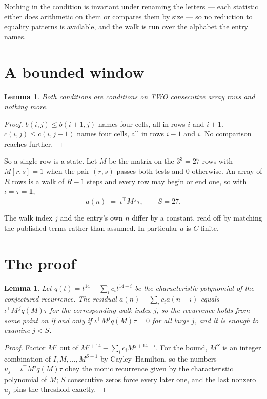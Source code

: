 \documentclass[11pt,a4paper]{article}
\theoremstyle{plain}
\newtheorem{lemma}[theorem]{Lemma}
\theoremstyle{definition}
\begin{document}
Nothing in the condition is invariant under renaming the letters --- each statistic either does
arithmetic on them or compares them by size --- so no reduction to equality patterns is
available, and the walk is run over the alphabet the entry names.

\section{A bounded window}

\begin{lemma}\label{lem:win}
Both conditions are conditions on TWO consecutive array rows and nothing more.
\end{lemma}

\begin{proof}
$b(i,j)\le b(i{+}1,j)$ names four cells, all in rows $i$ and $i+1$. $c(i,j)\le c(i,j{+}1)$
names four cells, all in rows $i-1$ and $i$. No comparison reaches further.
\end{proof}

So a single row is a state. Let $M$ be the matrix on the $3^{3}=27$ rows with
$M[r,s]=1$ when the pair $(r,s)$ passes both tests and $0$ otherwise. An array of $R$ rows is a
walk of $R-1$ steps and every row may begin or end one, so with $\iota=\tau=\mathbf{1}$,
\[
a(n)\;=\;\iota^{\!\top}M^{\,j}\tau ,\qquad S=27.
\]

The walk index $j$ and the entry's own $n$ differ by a constant, read off by matching the
published terms rather than assumed. In particular $a$ is $C$-finite.

\section{The proof}

\begin{lemma}\label{lem:crit}
Let $q(t)=t^{14}-\sum_i c_it^{14-i}$ be the characteristic polynomial of the
conjectured recurrence. The residual $a(n)-\sum_ic_ia(n-i)$ equals
$\iota^{\!\top}M^{\,j}q(M)\tau$ for the corresponding walk index $j$, so the recurrence
holds from some point on if and only if $\iota^{\!\top}M^{j}q(M)\tau=0$ for all large $j$,
and it is enough to examine $j<S$.
\end{lemma}

\begin{proof}
Factor $M^{j}$ out of $M^{j+14}-\sum_ic_iM^{j+14-i}$. For the bound, $M^{S}$
is an integer combination of $I,M,\dots,M^{S-1}$ by Cayley--Hamilton, so the numbers
$u_j=\iota^{\!\top}M^{j}q(M)\tau$ obey the monic recurrence given by the characteristic
polynomial of $M$; $S$ consecutive zeros force every later one, and the last nonzero $u_j$
pins the threshold exactly.
\end{proof}
\end{document}
